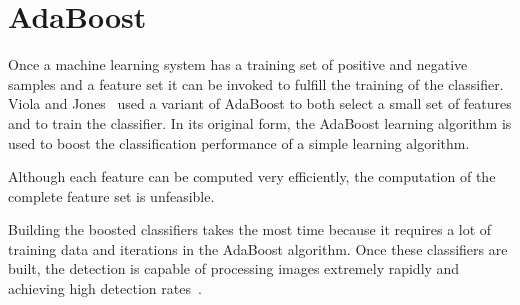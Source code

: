 \documentclass{article}
\begin{document}
\section{AdaBoost}
Once a machine learning system has a training set of positive and negative samples and a feature set it can be invoked to fulfill the training of the classifier. Viola and Jones~\cite{viola2001rapid} used a variant of AdaBoost to both select a small set of features and to train the classifier. In its original form, the AdaBoost learning algorithm is used to boost the classification performance of a simple  learning algorithm.
\par
Although each feature can be computed very efficiently, the computation of the complete feature set is unfeasible.
\par
Building the boosted classifiers takes the most time because it requires a lot of training data and iterations in the AdaBoost algorithm. Once these classifiers are built, the detection is capable of processing images extremely rapidly and achieving high detection rates~\cite{viola2001rapid}.
\end{document}
